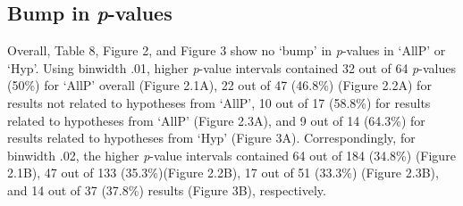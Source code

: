 \documentclass[
  12pt,
]{article}
\begin{document}
\pagebreak

\hspace{10em}

\hypertarget{bump-in-p-values}{%
\subsection{\texorpdfstring{Bump in
\emph{p}-values}{Bump in p-values}}\label{bump-in-p-values}}

Overall, Table 8, Figure 2, and Figure 3 show no `bump' in
\emph{p}-values in `AllP' or `Hyp'. Using binwidth .01, higher
\emph{p}-value intervals contained 32 out of 64 \emph{p}-values (50\%)
for `AllP' overall (Figure 2.1A), 22 out of 47 (46.8\%) (Figure 2.2A)
for results not related to hypotheses from `AllP', 10 out of 17 (58.8\%)
for results related to hypotheses from `AllP' (Figure 2.3A), and 9 out
of 14 (64.3\%) for results related to hypotheses from `Hyp' (Figure 3A).
Correspondingly, for binwidth .02, the higher \emph{p}-value intervals
contained 64 out of 184 (34.8\%) (Figure 2.1B), 47 out of 133
(35.3\%)(Figure 2.2B), 17 out of 51 (33.3\%) (Figure 2.3B), and 14 out
of 37 (37.8\%) results (Figure 3B), respectively.

\pagebreak
\end{document}
